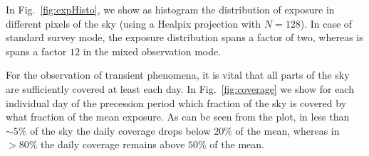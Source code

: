 \documentclass[aps,prd,superscriptaddress,showpacs,nofootinbib,fixlfloat, 12pt]{revtex4-1}
\begin{document}
In Fig.~\ref{fig:expHisto}, we show as histogram the distribution of exposure
in different pixels of the sky (using a Healpix projection with $N=128$). In
case of standard survey mode, the exposure distribution spans a factor of two,
whereas is spans a factor $12$ in the mixed observation mode. 

For the observation of transient phenomena, it is vital that all parts of the
sky are sufficiently covered at least each day. In Fig.~\ref{fig:coverage} we
show for each individual day of the precession period which fraction of the
sky is covered by what fraction of the mean exposure. As can be seen from the
plot, in less than $\sim5\%$ of the sky the daily coverage drops below $20\%$
of the mean, whereas in $>80\%$ the daily coverage remains above $50\%$ of the
mean.
\end{document}
